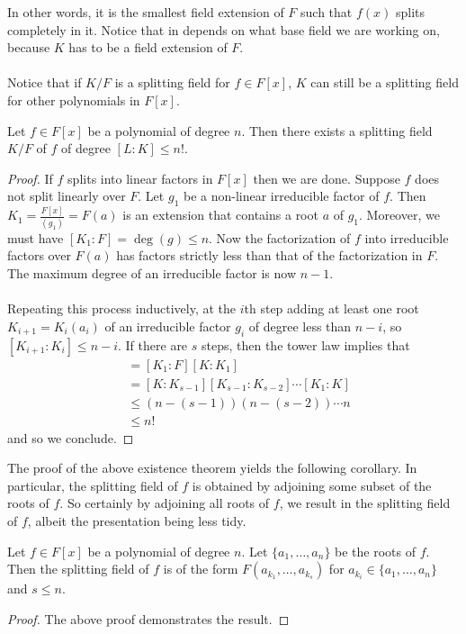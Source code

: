 \documentclass[a4paper]{article}
\begin{document}
In other words, it is the smallest field extension of $F$ such that $f(x)$ splits completely in it. Notice that in depends on what base field we are working on, because $K$ has to be a field extension of $F$. \\~\\

Notice that if $K/F$ is a splitting field for $f\in F[x]$, $K$ can still be a splitting field for other polynomials in $F[x]$. 

\begin{thm}{}{} Let $f\in F[x]$ be a polynomial of degree $n$. Then there exists a splitting field $K/F$ of $f$ of degree $[L:K]\leq n!$. \tcbline
\begin{proof}
If $f$ splits into linear factors in $F[x]$ then we are done. Suppose $f$ does not split linearly over $F$. Let $g_1$ be a non-linear irreducible factor of $f$. Then $K_1=\frac{F[x]}{(g_1)}=F(a)$ is an extension that contains a root $a$ of $g_1$. Moreover, we must have $[K_1:F]=\deg(g)\leq n$. Now the factorization of $f$ into irreducible factors over $F(a)$ has factors strictly less than that of the factorization in $F$. The maximum degree of an irreducible factor is now $n-1$. \\~\\

Repeating this process inductively, at the $i$th step adding at least one root $K_{i+1}=K_i(a_i)$ of an irreducible factor $g_i$ of degree less than $n-i$, so $[K_{i+1}:K_i]\leq n-i$. If there are $s$ steps, then the tower law implies that 
\begin{align*}
[K:F]&=[K_1:F][K:K_1]\\
&=[K:K_{s-1}][K_{s-1}:K_{s-2}]\cdots[K_1:K]\\
&\leq (n-(s-1))(n-(s-2))\cdots n\\
&\leq n!
\end{align*}
and so we conclude. 
\end{proof}
\end{thm}

The proof of the above existence theorem yields the following corollary. In particular, the splitting field of $f$ is obtained by adjoining some subset of the roots of $f$. So certainly by adjoining all roots of $f$, we result in the splitting field of $f$, albeit the presentation being less tidy. 

\begin{crl}{}{} Let $f\in F[x]$ be a polynomial of degree $n$. Let $\{a_1,\dots,a_n\}$ be the roots of $f$. Then the splitting field of $f$ is of the form $F(a_{k_1},\dots,a_{k_s})$ for $a_{k_i}\in\{a_1,\dots,a_n\}$ and $s\leq n$. \tcbline
\begin{proof}
The above proof demonstrates the result. 
\end{proof}
\end{crl}
\end{document}
